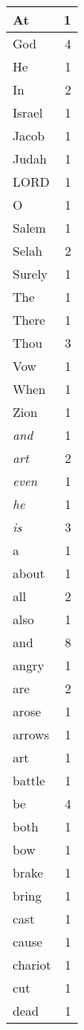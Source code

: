 \begin{center}
\begin{longtable}{l|r}
\hline \hline
\endlastfoot
At & 1 \\ \hline
God & 4 \\ \hline
He & 1 \\ \hline
In & 2 \\ \hline
Israel & 1 \\ \hline
Jacob & 1 \\ \hline
Judah & 1 \\ \hline
LORD & 1 \\ \hline
O & 1 \\ \hline
Salem & 1 \\ \hline
Selah & 2 \\ \hline
Surely & 1 \\ \hline
The & 1 \\ \hline
There & 1 \\ \hline
Thou & 3 \\ \hline
Vow & 1 \\ \hline
When & 1 \\ \hline
Zion & 1 \\ \hline
\emph{and} & 1 \\ \hline
\emph{art} & 2 \\ \hline
\emph{even} & 1 \\ \hline
\emph{he} & 1 \\ \hline
\emph{is} & 3 \\ \hline
a & 1 \\ \hline
about & 1 \\ \hline
all & 2 \\ \hline
also & 1 \\ \hline
and & 8 \\ \hline
angry & 1 \\ \hline
are & 2 \\ \hline
arose & 1 \\ \hline
arrows & 1 \\ \hline
art & 1 \\ \hline
battle & 1 \\ \hline
be & 4 \\ \hline
both & 1 \\ \hline
bow & 1 \\ \hline
brake & 1 \\ \hline
bring & 1 \\ \hline
cast & 1 \\ \hline
cause & 1 \\ \hline
chariot & 1 \\ \hline
cut & 1 \\ \hline
dead & 1 \\ \hline

\end{longtable}
\end{center}
